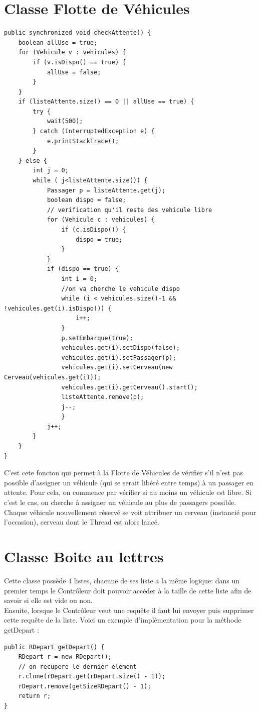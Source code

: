\documentclass[a4paper, titlepage]{report}
\begin{document}
\section{Classe Flotte de Véhicules}
\begin{lstlisting}
public synchronized void checkAttente() {
	boolean allUse = true;
	for (Vehicule v : vehicules) {
		if (v.isDispo() == true) {
			allUse = false;
		}
	}
	if (listeAttente.size() == 0 || allUse == true) {
		try {
			wait(500);	
		} catch (InterruptedException e) {
			e.printStackTrace();
		}
	} else {
		int j = 0;
		while ( j<listeAttente.size()) {
			Passager p = listeAttente.get(j);
			boolean dispo = false;
			// verification qu'il reste des vehicule libre
			for (Vehicule c : vehicules) {
				if (c.isDispo()) {
					dispo = true;
				}
			}
			if (dispo == true) {
				int i = 0;
				//on va cherche le vehicule dispo
				while (i < vehicules.size()-1 && !vehicules.get(i).isDispo()) {
					i++;
				}
				p.setEmbarque(true);
				vehicules.get(i).setDispo(false);
				vehicules.get(i).setPassager(p);
				vehicules.get(i).setCerveau(new Cerveau(vehicules.get(i)));
				vehicules.get(i).getCerveau().start();
				listeAttente.remove(p);
				j--;
				}
			j++;
		}
	}
}
\end{lstlisting}
C'est cete foncton qui permet à la Flotte de Véhicules de vérifier s'il n'est pas possible d'assigner un véhicule (qui se serait libéré entre temps) à un passager en attente. Pour cela, on commence par vérifier si au moins un véhicule est libre. Si c'est le cas, on cherche à assigner un véhicule au plus de passagers possible. Chaque véhicule nouvellement réservé se voit attribuer un cerveau (instancié pour l'occasion), cerveau dont le Thread est alors lancé.
\vspace{0.3cm}
\section{Classe Boite au lettres}
Cette classe possède 4 listes, chacune de ses liste a la même logique: dans un premier temps le Contrôleur doit pouvoir accéder à la taille de cette liste afin de savoir si elle est vide ou non.
\\
Ensuite, lorsque le Contrôleur veut une requête il faut lui envoyer puis supprimer cette requête de la liste. Voici un exemple d'implémentation pour la méthode getDepart :

\begin{lstlisting}
public RDepart getDepart() {
	RDepart r = new RDepart();
	// on recupere le dernier element
	r.clone(rDepart.get(rDepart.size() - 1));
	rDepart.remove(getSizeRDepart() - 1);
	return r;
}
\end{lstlisting}
\end{document}
